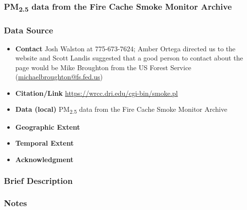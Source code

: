 \clearpage
\subsubsection{\texorpdfstring{PM\textsubscript{2.5}}{} data from the Fire Cache Smoke Monitor Archive}



\subsubsection*{Data Source}

\begin{itemize}[nolistsep]
\item \textbf{Contact} Josh Walston at 775-673-7624; Amber Ortega directed us to the website and Scott Landis suggested that a good person to contact about the page would be Mike Broughton from the US Forest Service (\url{michaelbroughton@fs.fed.us})
\item \textbf{Citation/Link} \url{https://wrcc.dri.edu/cgi-bin/smoke.pl}
\item \textbf{Data (local)} PM\textsubscript{2.5} data from the Fire Cache Smoke Monitor Archive
\item \textbf{Geographic Extent}
\item \textbf{Temporal Extent}
\item \textbf{Acknowledgment}
\end{itemize}

\subsubsection*{Brief Description}

\subsubsection*{Notes}


